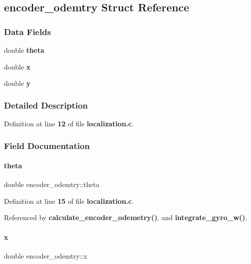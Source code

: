 \subsection{encoder\+\_\+odemtry Struct Reference}
\label{structencoder__odemtry}
\subsubsection*{Data Fields}
\begin{DoxyCompactItemize}
\item 
double \textbf{ theta}
\item 
double \textbf{ x}
\item 
double \textbf{ y}
\end{DoxyCompactItemize}


\subsubsection{Detailed Description}


Definition at line \textbf{ 12} of file \textbf{ localization.\+c}.



\subsubsection{Field Documentation}
\mbox{\label{structencoder__odemtry_af1a1e2a2a7a2f89138a8c261a3b82898}} 
\paragraph{theta}
{\footnotesize\ttfamily double encoder\+\_\+odemtry\+::theta}



Definition at line \textbf{ 15} of file \textbf{ localization.\+c}.



Referenced by \textbf{ calculate\+\_\+encoder\+\_\+odemetry()}, and \textbf{ integrate\+\_\+gyro\+\_\+w()}.

\mbox{\label{structencoder__odemtry_a9a803978381f9b89a031d520a627cbcf}} 
\paragraph{x}
{\footnotesize\ttfamily double encoder\+\_\+odemtry\+::x}



